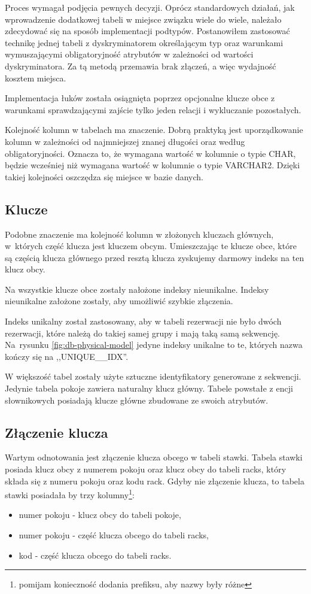 \documentclass[a4paper,onecolumn,oneside,11pt,wide,floatssmall]{mwrep}
\theoremstyle{definition}
\theoremstyle{plain}%
\theoremstyle{remark}
\begin{document}
Proces wymagał podjęcia pewnych decyzji. Oprócz standardowych działań, jak wprowadzenie dodatkowej tabeli w miejsce związku wiele do wiele, należało zdecydować się na sposób implementacji podtypów. Postanowiłem zastosować technikę jednej tabeli z dyskryminatorem określającym typ oraz warunkami wymuszającymi obligatoryjność atrybutów w zależności od wartości dyskryminatora. Za tą metodą przemawia brak złączeń, a więc wydajność kosztem miejsca.

Implementacja łuków została osiągnięta poprzez opcjonalne klucze obce z warunkami sprawdzającymi zajście tylko jeden relacji i wykluczanie pozostałych.

Kolejność kolumn w tabelach ma znaczenie. Dobrą praktyką jest uporządkowanie kolumn w zależności od najmniejszej znanej długości oraz według obligatoryjności. Oznacza to, że wymagana wartość w kolumnie o typie CHAR, będzie wcześniej niż wymagana wartość w kolumnie o typie VARCHAR2. Dzięki takiej kolejności oszczędza się miejsce w bazie danych.

\subsection{Klucze}
Podobne znaczenie ma kolejność kolumn w złożonych kluczach głównych, \mbox{w których} część klucza jest kluczem obcym. Umieszczając te klucze obce, które są częścią klucza głównego przed resztą klucza zyskujemy darmowy indeks na ten klucz obcy.

Na wszystkie klucze obce zostały nałożone indeksy nieunikalne. Indeksy nieunikalne założone zostały, aby umożliwić szybkie złączenia. 

Indeks unikalny został zastosowany, aby w tabeli rezerwacji nie było dwóch rezerwacji, które należą do takiej samej grupy i mają taką samą sekwencję. \mbox{Na rysunku} \ref{fig:db-physical-model} jedyne indeksy unikalne to te, których nazwa kończy się na ,,UNIQUE\_\_IDX''.

W większość tabel zostały użyte sztuczne identyfikatory generowane z sekwencji. Jedynie tabela pokoje zawiera naturalny klucz główny. Tabele powstałe z encji słownikowych posiadają klucze główne zbudowane ze swoich atrybutów.

\subsection{Złączenie klucza}
Wartym odnotowania jest złączenie klucza obcego w tabeli stawki. Tabela stawki posiada klucz obcy z numerem pokoju oraz klucz obcy do tabeli racks, który składa się z numeru pokoju oraz kodu rack. Gdyby nie złączenie klucza, to tabela stawki posiadała by trzy kolumny\footnote{pomijam konieczność dodania prefiksu, aby nazwy były różne}:
\begin{itemize}
  \item numer pokoju - klucz obcy do tabeli pokoje,
  \item numer pokoju - część klucza obcego do tabeli racks,
  \item kod - część klucza obcego do tabeli racks.
\end{itemize}
\end{document}
